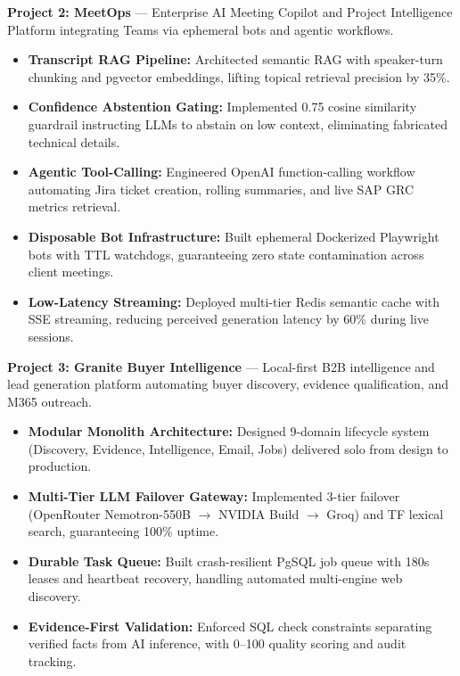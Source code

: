\documentclass[a4paper,10pt]{article}
\begin{document}
\noindent
\textbf{\color{projecttitle}Project 2: MeetOps} --- Enterprise AI Meeting Copilot and Project Intelligence Platform integrating Teams via ephemeral bots and agentic workflows.
\begin{itemize}
    \item \textbf{Transcript RAG Pipeline:} Architected semantic RAG with speaker-turn chunking and pgvector embeddings, lifting topical retrieval precision by 35\%.
    \item \textbf{Confidence Abstention Gating:} Implemented 0.75 cosine similarity guardrail instructing LLMs to abstain on low context, eliminating fabricated technical details.
    \item \textbf{Agentic Tool-Calling:} Engineered OpenAI function-calling workflow automating Jira ticket creation, rolling summaries, and live SAP GRC metrics retrieval.
    \item \textbf{Disposable Bot Infrastructure:} Built ephemeral Dockerized Playwright bots with TTL watchdogs, guaranteeing zero state contamination across client meetings.
    \item \textbf{Low-Latency Streaming:} Deployed multi-tier Redis semantic cache with SSE streaming, reducing perceived generation latency by 60\% during live sessions.
\end{itemize}

\vspace{5pt}

\noindent
\textbf{\color{projecttitle}Project 3: Granite Buyer Intelligence} --- Local-first B2B intelligence and lead generation platform automating buyer discovery, evidence qualification, and M365 outreach.
\begin{itemize}
    \item \textbf{Modular Monolith Architecture:} Designed 9-domain lifecycle system (Discovery, Evidence, Intelligence, Email, Jobs) delivered solo from design to production.
    \item \textbf{Multi-Tier LLM Failover Gateway:} Implemented 3-tier failover (OpenRouter Nemotron-550B $\rightarrow$ NVIDIA Build $\rightarrow$ Groq) and TF lexical search, guaranteeing 100\% uptime.
    \item \textbf{Durable Task Queue:} Built crash-resilient PgSQL job queue with 180s leases and heartbeat recovery, handling automated multi-engine web discovery.
    \item \textbf{Evidence-First Validation:} Enforced SQL check constraints separating verified facts from AI inference, with 0--100 quality scoring and audit tracking.
\end{itemize}
\end{document}
